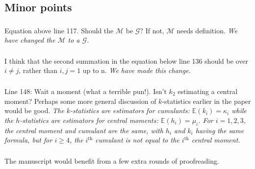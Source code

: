 \documentclass[11pt]{amsart}
\begin{document}
\subsection*{Minor points}
\subsubsection{} Equation above line 117. Should the $\mathcal{M}$ be $\mathcal{G}?$ If not, $\mathcal{M}$ needs definition. \textit{We have changed the $\mathcal{M}$ to a $\mathcal{G}$.}
\subsubsection{} I think that the second summation in the equation below line 136 should be over $i\neq j$, rather than
$i,j = 1$ up to n.
\textit{We have made this change.}
\subsubsection{} Line 148: Wait a moment (what a terrible pun!). Isn't $k_2$ estimating a central moment? Perhaps some more general discussion of $k$-statistics earlier in the paper would be good. 
\textit{The $k$-statistics are estimators for cumulants: $\mathbb{E}(k_i) = \kappa_i$ while the $h$-statistics are estimators for central moments: $\mathbb{E}(h_i) = \mu_i$. For $i=1,2,3$, the central moment and cumulant are the same, with $h_i$ and $k_i$ having the same formula, but for $i\geq 4$, the $i^\text{th}$ cumulant is not equal to the $i^\text{th}$ central moment.}
\subsubsection{} The manuscript would benefit from a few extra rounds of proofreading.
\end{document}
